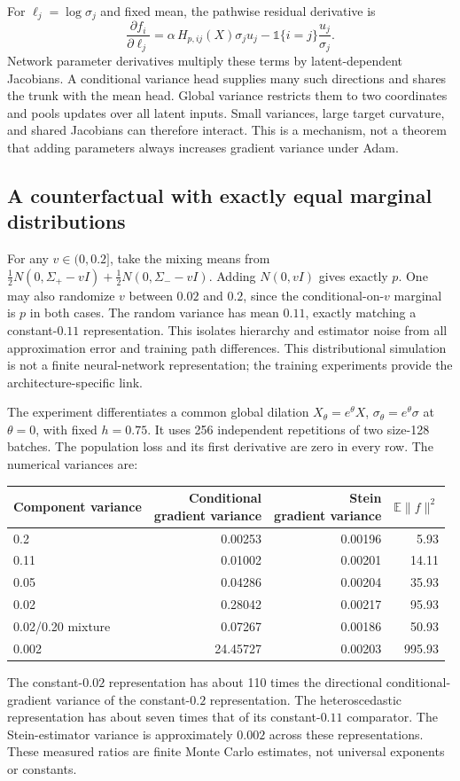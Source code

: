 \documentclass[11pt,a4paper]{article}
\numberwithin{equation}{section}
\newcommand{\E}{\mathbb E}
\begin{document}
For $\ell_j=\log\sigma_j$ and fixed mean, the pathwise residual derivative is
\[
 \frac{\partial f_i}{\partial\ell_j}
 =\alpha\,H_{p,ij}(X)\sigma_j u_j
          -\mathbb 1\{i=j\}\frac{u_j}{\sigma_j}.
\]
Network parameter derivatives multiply these terms by latent-dependent
Jacobians. A conditional variance head supplies many such directions and
shares the trunk with the mean head. Global variance restricts them to two
coordinates and pools updates over all latent inputs. Small variances,
large target curvature, and shared Jacobians can therefore interact.
This is a mechanism, not a theorem that adding parameters always increases
gradient variance under Adam.

\subsection{A counterfactual with exactly equal marginal distributions}
For any $v\in(0,0.2]$, take the mixing means from
$\tfrac12N(0,\Sigma_+-vI)+\tfrac12N(0,\Sigma_--vI)$.
Adding $N(0,vI)$ gives exactly $p$. One may also randomize $v$ between
$0.02$ and $0.2$, since the conditional-on-$v$ marginal is $p$ in both cases.
The random variance has mean $0.11$, exactly matching a constant-$0.11$
representation. This isolates hierarchy and estimator noise from all
approximation error and training path differences. This distributional
simulation is not a finite neural-network representation; the training
experiments provide the architecture-specific link.

The experiment differentiates a common global dilation
$X_\theta=e^\theta X$, $\sigma_\theta=e^\theta\sigma$ at $\theta=0$,
with fixed $h=0.75$. It uses 256 independent repetitions of two size-128
batches. The population loss and its first derivative are zero in every
row. The numerical variances are:
\begin{center}
\begin{tabular}{lrrr}\toprule
Component variance & \shortstack{Conditional\\gradient variance} & \shortstack{Stein\\gradient variance} & $\E\|f\|^2$\\\midrule
0.2 & 0.00253 & 0.00196 & 5.93 \\
0.11 & 0.01002 & 0.00201 & 14.11 \\
0.05 & 0.04286 & 0.00204 & 35.93 \\
0.02 & 0.28042 & 0.00217 & 95.93 \\
0.02/0.20 mixture & 0.07267 & 0.00186 & 50.93 \\
0.002 & 24.45727 & 0.00203 & 995.93 \\
\bottomrule\end{tabular}
\end{center}
The constant-$0.02$ representation has about 110 times the directional
conditional-gradient variance of the constant-$0.2$ representation. The
heteroscedastic representation has about seven times that of its
constant-$0.11$ comparator. The Stein-estimator variance is approximately
$0.002$ across these representations. These measured ratios are finite
Monte Carlo estimates, not universal exponents or constants.
\end{document}
